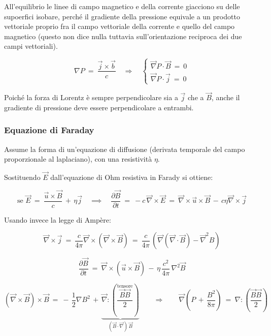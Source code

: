 All'equilibrio le linee di campo magnetico e della corrente giacciono su delle supoerfici isobare, perché il gradiente della pressione equivale a un prodotto vettoriale proprio fra il campo vettoriale della corrente e quello del campo magnetico (questo non dice nulla tuttavia sull'orientazione reciproca dei due campi vettoriali). 


\[
	\nabla P\ =\ \frac{\vec j \times \vec b}{c} 
	\quad \Rightarrow \quad
	\begin{cases}
		\vec \nabla P \cdot \vec B\ =\ 0\\
		\vec \nabla P \cdot \vec j\ =\ 0 
	\end{cases}
\]

Poiché la forza di Lorentz è sempre perpendicolare sia a $\vec j$ che a $\vec B$, anche il gradiente di pressione deve essere perpendicolare a entrambi.



%
%
\subsubsection{Equazione di Faraday} 
Assume la forma di un'equazione di diffusione (derivata temporale del campo proporzionale al laplaciano), con una resistività $\eta$.

Sostituendo $\vec E$ dall'equazione di Ohm resistiva in Farady si ottiene:

\[\text{se } \vec E\ =\ \frac{\vec u \times \vec B}{c}\, +\, \eta \vec j
\quad \implies \quad
\frac{\partial \vec B}{\partial t}\ =\ -c\, \vec \nabla \times \vec E\ =\ \vec \nabla \times \vec u\times \vec B\, -\, c\eta \vec \nabla \times\vec j\]

Usando invece la legge di Ampère:

\[\vec \nabla\times \vec j\ =\ \frac{c}{4\pi} \vec \nabla \times  (\vec \nabla \times \vec B)\ =\ \frac{c}{4\pi}\, (\vec \nabla (\vec \nabla\cdot \vec B) - \vec \nabla^2 B)\]


\[\boxed{\ \frac{\partial \vec B}{\partial t}\ =\ \vec \nabla \times (\vec u\times \vec B)\, -\, \eta\,\frac{c^2}{4\pi}\,\nabla^2\vec B\ } \] 

\[\left(\vec \nabla \times \vec B \right)\times \vec B\ =\ 
-\,\frac{1}{2}\nabla B^2\, +\, \underset{(\vec B\cdot \vec \nabla)\,\vec B}{\underbrace{\vec\nabla : \left(\frac{\overset{\text{tensore}}{\vec B \vec B}}{2}\right)}} 
\qquad \Rightarrow \qquad
\vec \nabla \left(P\,+\, \frac{B^2}{8\pi}\right)\ =\ \nabla : \left(\frac{\vec B \vec B}{2}\right)
\]


